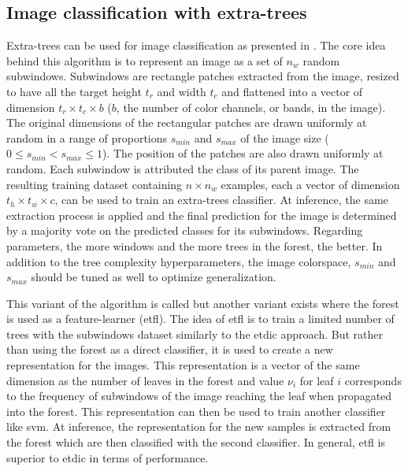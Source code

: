 \subsection{Image classification with extra-trees}
\label{ssec:backml:et_image}

Extra-trees can be used for image classification as presented in \cite{maree2016towards}.
The core idea behind this algorithm is to represent an image as a set of $n_w$
random subwindows. Subwindows are rectangle patches extracted from the image,
resized to have all the target height $t_r$ and width $t_c$ and flattened into a
vector of dimension $t_r \times t_c \times b$ ($b$, the number of color channels,
or bands, in the image). The original dimensions of the rectangular patches are
drawn uniformly at random in a range of proportions $s_{min}$ and $s_{max}$ of
the image size ($0 \leq s_{min} < s_{max} \leq 1$). The position of the patches are
also drawn uniformly at random. Each subwindow is attributed the class of its
parent image. The resulting training dataset containing $n \times n_w$ examples,
each a vector of dimension $t_h \times t_w \times c$, can be used to train an
extra-trees classifier. At inference, the same extraction process is applied and
the final prediction for the image is determined by a majority vote on the predicted
classes for its subwindows. Regarding parameters, the more windows and the more
trees in the forest, the better. In addition to the tree complexity hyperparameters,
the image colorspace, $s_{min}$ and $s_{max}$ should be tuned as well to optimize
generalization.

This variant of the algorithm is called  but another variant
exists where the forest is used as a feature-learner (\acrshort{etfl}). The idea
of \acrshort{etfl} is to train a limited number of trees with the subwindows
dataset similarly to the \acrshort{etdic} approach. But rather than using the
forest as a direct classifier, it is used to create a new representation for the
images. This representation is a vector of the same dimension as the number of
leaves in the forest and value $\nu_i$ for leaf $i$ corresponds to the frequency
of subwindows of the image reaching the leaf when propagated into the forest. This
representation can then be used to train another classifier like \acrshort{svm}.
At inference, the representation for the new samples is extracted from the forest
which are then classified with the second classifier. In general, \acrshort{etfl}
is superior to \acrshort{etdic} in terms of performance.

